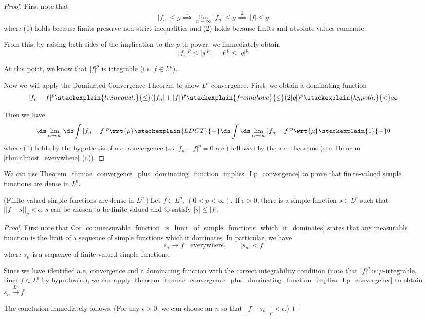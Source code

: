 \documentclass{article} %
\newcommand{\dlim}{\ds\lim}
\newcommand{\dint}{\ds\int}
\newcommand{\dmu}{\wrt{\mu}}
\newcommand{\convergenceInLp}{\stackrel{L^p}{\to}}
\begin{document}
\begin{proof}
First note that
\[ |f_n| \leq g \stackrel{1}{\implies} \lim_{n \to \infty } |f_n| \leq g \stackrel{2}{\implies} |f| \leq g\]
where (1) holds because limits preserve non-strict inequalities and (2) holds because limits and absolute values commute. 

From this, by raising both sides of the implication to the $p$-th power, we immediately obtain
\[ |f_n|^p \leq |g|^p, \quad |f|^p \leq |g|^p \]	

At this point, we know that $|f|^p$ is integrable (i.e. $f \in L^p$). 

Now we will apply the Dominated Convergence Theorem to show $L^p$ convergence.  First, we obtain a dominating function
\[ |f_n -f|^p \stackexplain{tr. inequal.}{\leq} (|f_n| + |f|)^p \stackexplain{from above}{\leq} (2 |g|)^p \stackexplain{hypoth.}{<} \infty\]

Then we have
%
\[ \dlim_{n \to \infty} \dint |f_n - f|^p \dmu \stackexplain{LDCT}{=} \dint \dlim_{n \to \infty}  |f_n - f|^p \dmu \stackexplain{1}{=}   0 \]
where (1) holds by the hypothesis of a.e. convergence (so $|f_n - f|^p =0$ a.e.) followed by the a.e. theorems (see Theorem \ref{thm:almost_everywhere} (a)). 
\end{proof}


We can use Theorem~\ref{thm:ae_convergence_plus_dominating_function_implies_Lp_convergence} to prove that finite-valued simple functions are dense in $L^p$.

\begin{theorem}\textnormal{(Finite valued simple functions are dense in $L^p$.)}
Let $f \in L^p, \; (0 < p < \infty)$. If $\epsilon >0$, there is a simple function $s \in L^p$ such that $||f-s||_p < \epsilon$; $s$ can be chosen to be finite-valued and to satisfy $|s| \leq |f|$.
\label{thm:finite_valued_simple_functions_are_dense_in_Lp}	
\end{theorem}

\begin{proof}
First note that Cor \ref{cor:measurable_function_is_limit_of_simple_functions_which_it_dominates} states that any measurable function  is the limit of a sequence of simple functions which it dominates.   In particular, we have
\[s_n \to f \quad \text{everywhere}, \quad\quad |s_n| < f \]
where $s_n$ is a sequence of finite-valued simple functions.

Since we have identified a.e. convergence and a dominating function with the correct integrability condition {\tiny (note that $|f|^p$ is $\mu$-integrable, since $f \in L^p$ by hypothesis.)}, we can apply Theorem~\ref{thm:ae_convergence_plus_dominating_function_implies_Lp_convergence} to obtain  $s_n \convergenceInLp f$.   

The conclusion immediately follows. {\tiny (For any $\epsilon>0$, we can choose an $n$ so that $||f-s_n||_p < \epsilon$.)}
 

\end{proof}
\end{document}
